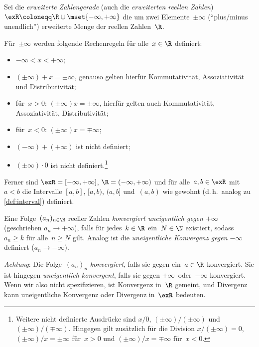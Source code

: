 \documentclass[a4paper]{article}
\begin{document}
\begin{definition}
    Sei die \emph{erweiterte Zahlengerade} (auch die \emph{erweiterten reellen Zahlen}) $\exR \coloneqq \R \cup \mset{-\infty, +\infty}$ die um zwei Elemente~$\pm\infty$ ("`plus/minus unendlich"') erweiterte Menge der reellen Zahlen~$\R$.

    Für~$\pm\infty$ werden folgende Rechenregeln für alle~$x \in \R$ definiert:
    \begin{itemize}
        \item $-\infty < x < +\infty$;
        \item $(\pm\infty) + x = \pm\infty$, genauso gelten hierfür Kommutativität, Assoziativität und Distributivität;
        \item für~$x > 0$: $(\pm\infty) x = \pm\infty$, hierfür gelten auch Kommutativität, Assoziativität, Distributivität;
        \item für~$x < 0$: $(\pm\infty) x = \mp\infty$;
        \item $(-\infty) + (+\infty)$ ist nicht definiert;
        \item $(\pm\infty) \cdot 0$ ist nicht definiert.\footnote{Weitere nicht definierte Ausdrücke sind $x/0$, $(\pm\infty) / (\pm\infty)$ und $(\pm\infty) / (\mp\infty)$. Hingegen gilt zusätzlich für die Division $x / (\pm\infty) = 0$, $(\pm\infty) / x = \pm\infty$ für~$x > 0$ und $(\pm\infty) / x = \mp\infty$ für~$x < 0$.}
    \end{itemize}

    Ferner sind $\exR = [-\infty, +\infty]$, $\R = (-\infty, +\infty)$ und für alle~$a, b \in \exR$ mit~$a < b$ die Intervalle $[a, b]$, $[a, b)$, $(a, b]$ und~$(a, b)$ wie gewohnt (d.\,h.\ analog zu \cref{def:interval}) definiert.
\end{definition}

\begin{definition}
    Eine Folge~$(a_n)_{n\in\N}$ reeller Zahlen \emph{konvergiert uneigentlich gegen $+\infty$} (geschrieben $a_n \to +\infty$), falls für jedes~$k \in \R$ ein~$N \in \N$ existiert, sodass $a_n \geq k$ für alle~$n \geq N$ gilt. Analog ist die \emph{uneigentliche Konvergenz gegen $-\infty$} definiert ($a_n \to -\infty$).
\end{definition}

\emph{Achtung}: Die Folge~$(a_n)_n$ \emph{konvergiert}, falls sie gegen ein~$a \in \R$ konvergiert. Sie ist hingegen \emph{uneigentlich konvergent}, falls sie gegen $+\infty$~oder~$-\infty$ konvergiert. Wenn wir also nicht spezifizieren, ist Konvergenz in~$\R$ gemeint, und Divergenz kann uneigentliche Konvergenz oder Divergenz in~$\exR$ bedeuten.
\end{document}
